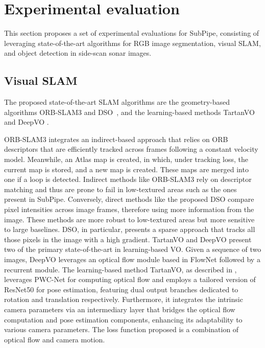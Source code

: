 \section{Experimental evaluation}
\label{sec:evaluations}

This section proposes a set of experimental evaluations for SubPipe, consisting of leveraging state-of-the-art algorithms for RGB image segmentation, visual SLAM, and object detection in side-scan sonar images.


\subsection{Visual SLAM}
The proposed state-of-the-art SLAM algorithms are the geometry-based algorithms ORB-SLAM3 \cite{campos2021orb} and DSO~\cite{engel2017dso}, and the learning-based methods TartanVO \cite{wang2020tartanvo} and DeepVO \cite{wang2017deepvo}. 

ORB-SLAM3 integrates an indirect-based approach that relies on ORB descriptors that are efficiently tracked across frames following a constant velocity model. Meanwhile, an Atlas map is created, in which, under tracking loss, the current map is stored, and a new map is created. These maps are merged into one if a loop is detected.  Indirect methods like ORB-SLAM3 rely on descriptor matching and thus are prone to fail in low-textured areas such as the ones present in SubPipe. Conversely, direct methods like the proposed DSO compare pixel intensities across image frames, therefore using more information from the image. These methods are more robust to low-textured areas but more sensitive to large baselines. DSO, in particular, presents a sparse approach that tracks all those pixels in the image with a high gradient.
TartanVO \cite{wang2020tartanvo} and DeepVO \cite{wang2017deepvo} present two of the primary state-of-the-art in learning-based \ac{VO}. Given a sequence of two images, DeepVO leverages an optical flow module based in FlowNet \cite{dosovitskiy2015flownet} followed by a recurrent module. 
The learning-based method TartanVO, as described in \cite{wang2020tartanvo}, leverages PWC-Net \cite{sun2018pwcnet} for computing optical flow and employs a tailored version of ResNet50 \cite{dl:vo:2015resnet} for pose estimation, featuring dual output branches dedicated to rotation and translation respectively. Furthermore, it integrates the intrinsic camera parameters via an intermediary layer that bridges the optical flow computation and pose estimation components, enhancing its adaptability to various camera parameters. The loss function proposed is a combination of optical flow and camera motion.

